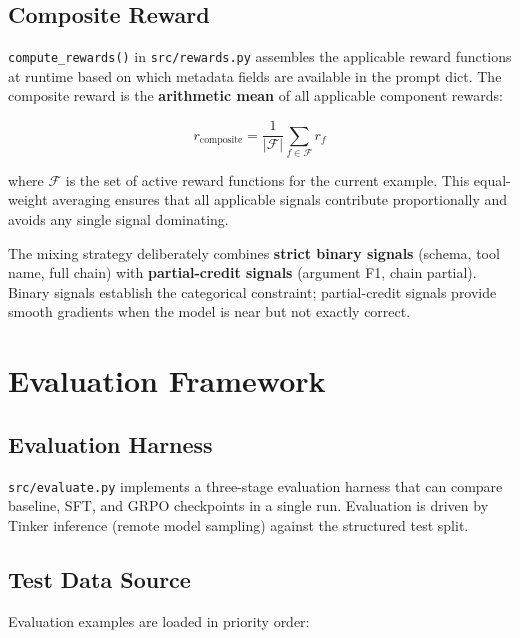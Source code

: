 \documentclass[12pt, a4paper]{article}
\begin{document}
\subsection{Composite Reward}

\texttt{compute\_rewards()} in \texttt{src/rewards.py} assembles the applicable
reward functions at runtime based on which metadata fields are available in the
prompt dict. The composite reward is the \textbf{arithmetic mean} of all
applicable component rewards:

\begin{equationbox}
\[
  r_{\text{composite}} = \frac{1}{|\mathcal{F}|}\sum_{f \in \mathcal{F}} r_f
\]
\end{equationbox}

where $\mathcal{F}$ is the set of active reward functions for the current
example. This equal-weight averaging ensures that all applicable signals
contribute proportionally and avoids any single signal dominating.

The mixing strategy deliberately combines \textbf{strict binary signals}
(schema, tool name, full chain) with \textbf{partial-credit signals}
(argument F1, chain partial). Binary signals establish the categorical
constraint; partial-credit signals provide smooth gradients when the model
is near but not exactly correct.

\section{Evaluation Framework}

\subsection{Evaluation Harness}

\texttt{src/evaluate.py} implements a three-stage evaluation harness that
can compare baseline, SFT, and GRPO checkpoints in a single run. Evaluation
is driven by Tinker inference (remote model sampling) against the structured
test split.

\subsection{Test Data Source}

Evaluation examples are loaded in priority order:
\end{document}
